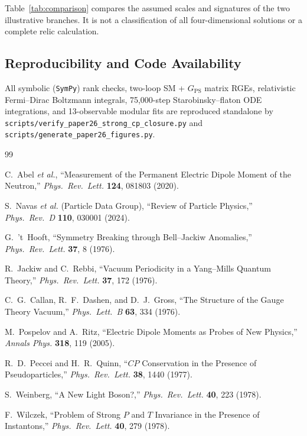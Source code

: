 \documentclass[11pt,a4paper]{article}
\begin{document}
Table~\ref{tab:comparison} compares the assumed scales and signatures of the two illustrative branches. It is not a classification of all four-dimensional solutions or a complete relic calculation.

\subsection*{Reproducibility and Code Availability}
All symbolic (\texttt{SymPy}) rank checks, two-loop SM + $G_{\mathrm{PS}}$ matrix RGEs, relativistic Fermi--Dirac Boltzmann integrals, 75,000-step Starobinsky--flaton ODE integrations, and 13-observable modular fits are reproduced standalone by \texttt{scripts/verify\_paper26\_strong\_cp\_closure.py} and \texttt{scripts/generate\_paper26\_figures.py}.

\begin{thebibliography}{99}
\small
\raggedright
\setlength{\itemsep}{2pt}

C.~Abel \textit{et al.}, ``Measurement of the Permanent Electric Dipole Moment of the Neutron,'' \emph{Phys.\ Rev.\ Lett.} \textbf{124}, 081803 (2020).

S.~Navas \textit{et al.} (Particle Data Group), ``Review of Particle Physics,'' \emph{Phys.\ Rev.\ D} \textbf{110}, 030001 (2024).

G.~'t~Hooft, ``Symmetry Breaking through Bell--Jackiw Anomalies,'' \emph{Phys.\ Rev.\ Lett.} \textbf{37}, 8 (1976).

R.~Jackiw and C.~Rebbi, ``Vacuum Periodicity in a Yang--Mills Quantum Theory,'' \emph{Phys.\ Rev.\ Lett.} \textbf{37}, 172 (1976).

C.~G.~Callan, R.~F.~Dashen, and D.~J.~Gross, ``The Structure of the Gauge Theory Vacuum,'' \emph{Phys.\ Lett.\ B} \textbf{63}, 334 (1976).

M.~Pospelov and A.~Ritz, ``Electric Dipole Moments as Probes of New Physics,'' \emph{Annals Phys.} \textbf{318}, 119 (2005).

R.~D.~Peccei and H.~R.~Quinn, ``$CP$ Conservation in the Presence of Pseudoparticles,'' \emph{Phys.\ Rev.\ Lett.} \textbf{38}, 1440 (1977).

S.~Weinberg, ``A New Light Boson?,'' \emph{Phys.\ Rev.\ Lett.} \textbf{40}, 223 (1978).

F.~Wilczek, ``Problem of Strong $P$ and $T$ Invariance in the Presence of Instantons,'' \emph{Phys.\ Rev.\ Lett.} \textbf{40}, 279 (1978).


\end{thebibliography}
\end{document}
